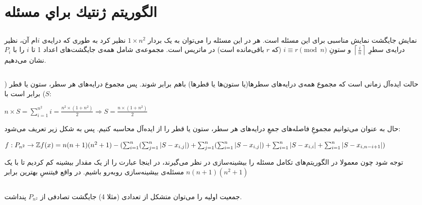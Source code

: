 \documentclass{article}
\begin{document}
\section{الگوريتم ژنتيك براي مسئله }
\subsection{}
نمایش جایگشت نمایش مناسبی برای این مسئله است. هر  در این مسئله را می‌توان به یک بردار
$1 \times n^2$
نظیر کرد به طوری که درایه‌ی $i$ام آن، نظیر درایه‌ی سطرِ
$
\left\lceil \frac{i}{n} \right\rceil
$
و ستونِ
$
i \equiv r \pmod{n} 
$
(که $r$ باقی‌مانده است) در ماتریس  است.
\newline
مجموعه‌ی شامل همه‌ی جایگشت‌های اعداد 1 تا $i$ را با $P_{i}$ نشان می‌دهیم.





\subsection{}
حالت ایده‌آل زمانی است که مجموع همه‌ی درایه‌های سطرها(یا ستون‌ها یا قطرها) باهم برابر شوند. پس مجموع درایه‌های هر سطر، ستون یا قطر ($S$) برابر است با:

\begin{latin}
$
n \times S = \sum_{i = 1}^{n^2}i = \frac{n^2 \times(1 + n^2)}{2}
\Longrightarrow
S = \frac{n \times(1 + n^2)}{2}
$
\end{latin}
حال به عنوان  می‌توانیم مجموعِ فاصله‌های جمعِ درایه‌های هر سطر، ستون یا قطر را از ایده‌آل محاسبه کنیم. پس   به شکل زیر تعریف می‌شود:

\begin{latin}
$
\newline
f: P_{n^2} \to \mathbb{Z}
\newline
f(x) =
n (n+1) (n^2 + 1)-
(   \sum_{i=1}^{n}(\sum_{j=1}^{n} \left| S - x_{i, j} \right|)
+ \sum_{j=1}^{n}(\sum_{i=1}^{n} \left| S - x_{i, j} \right|)
+ \sum_{i=1}^{n}\left| S - x_{i, i} \right|
+ \sum_{i=1}^{n}\left| S - x_{i, n-i+1} \right|)
$
\end{latin}
توجه شود چون معمولا در الگوریتم‌های تکامل مسئله را بیشینه‌سازی در نظر می‌گیرند، در اینجا عبارت را از یک مقدار بیشینه کم کردیم تا با یک مسئله‌ی بیشینه‌سازی رو‌به‌رو باشیم. در واقع فیتنسِ بهترین  برابر
$
n (n+1) (n^2 + 1)
$

\subsection{}
جمعیت اولیه را می‌توان متشکل از تعدادی (مثلا 4) جایگشت تصادفی از $P_{n^2}$ پنداشت.
\end{document}
